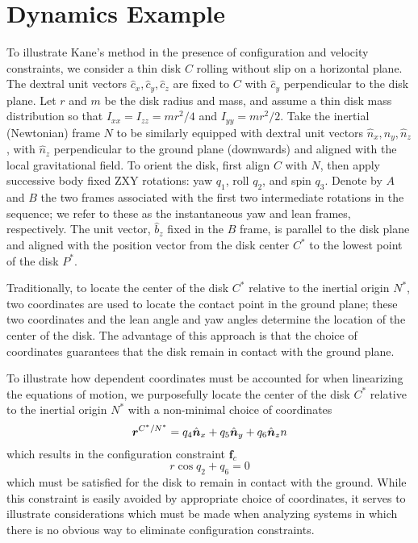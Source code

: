 \section{Dynamics Example}
\label{sec:example}
To illustrate Kane's method in the presence of configuration and velocity
constraints, we consider a thin disk $C$ rolling without slip on a horizontal
plane. The dextral unit vectors $\hat{c}_x, \hat{c}_y, \hat{c}_z$ are fixed to $C$
with $\hat{c}_y$ perpendicular to the disk plane. Let $r$ and $m$ be the
disk radius and mass, and assume a thin disk mass distribution so that
$I_{xx}=I_{zz}=mr^2/4$ and $I_{yy} = mr^2/2$. Take the inertial (Newtonian)
frame $N$ to be similarly equipped with dextral unit vectors $\hat{n}_x,
\hat{n}_y, \hat{n}_z$, with $\hat{n}_z$ perpendicular to the ground plane
(downwards) and aligned with the local gravitational field. To orient the disk,
first align $C$ with $N$, then apply successive body fixed ZXY rotations:
yaw $q_1$, roll $q_2$, and spin $q_3$.  Denote by $A$ and $B$ the two frames
associated with the first two intermediate rotations in the sequence; we refer
to these as the instantaneous yaw and lean frames, respectively. The unit
vector, $\hat{b}_z$ fixed in the $B$ frame, is parallel to the disk plane and
aligned with the position vector from the disk center $C^*$ to the lowest point
of the disk $P^*$.

Traditionally, to locate the center of the disk $C^*$
relative to the inertial origin $N^*$, two coordinates are used to locate the
contact point in the ground plane; these two coordinates and the lean angle
and yaw angles determine the location of the center of the disk. The advantage of this
approach is that the choice of coordinates guarantees that the disk remain in
contact with the ground plane.

To illustrate how dependent coordinates must be
accounted for when linearizing the equations of motion, we purposefully locate
the center of the disk $C^*$ relative to the inertial origin $N^*$ with a
non-minimal choice of coordinates
\begin{equation*}
  \boldsymbol{r}^{C^*/N^*} = q_4 \hat{\boldsymbol{n}}_{x} + q_5 \hat{\boldsymbol{n}}_{y} + q_6 \hat{\boldsymbol{n}}_{z}{n}
\end{equation*}
which results in the configuration constraint $\mathbf{f}_c$
\begin{equation}
  \label{rd:f_c}
  r\cos{q_2} + q_6 = 0
\end{equation}
which must be satisfied for the disk to remain in contact with the ground.
While this constraint is easily avoided by appropriate choice of coordinates,
it serves to illustrate considerations which must be made when analyzing
systems in which there is no obvious way to eliminate configuration constraints.


